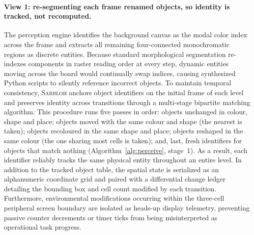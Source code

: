 \paragraph{View 1: re-segmenting each frame renamed objects, so identity is tracked, not recomputed.}
The perception engine identifies the background canvas as the modal color index across the frame and extracts all remaining four-connected monochromatic regions as discrete entities. Because standard morphological segmentation re-indexes components in raster reading order at every step, dynamic entities moving across the board would continually swap indices, causing synthesized Python scripts to silently reference incorrect objects. To maintain temporal consistency, \textsc{Sarbloh} anchors object identifiers on the initial frame of each level and preserves identity across transitions through a multi-stage bipartite matching algorithm. This procedure runs five passes in order: objects unchanged in colour, shape and place; objects moved with the same colour and shape (the nearest is taken); objects recoloured in the same shape and place; objects reshaped in the same colour (the one sharing most cells is taken); and, last, fresh identifiers for objects that match nothing (Algorithm~\ref{alg:perceive}, stage~1). As a result, each identifier reliably tracks the same physical entity throughout an entire level. In addition to the tracked object table, the spatial state is serialized as an alphanumeric coordinate grid and paired with a differential change ledger detailing the bounding box and cell count modified by each transition. Furthermore, environmental modifications occurring within the three-cell peripheral screen boundary are isolated as heads-up display telemetry, preventing passive counter decrements or timer ticks from being misinterpreted as operational task progress.

